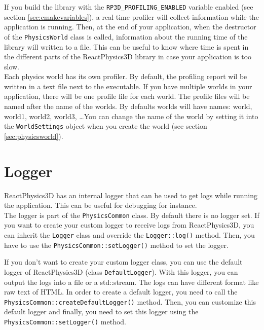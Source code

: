 \documentclass[a4paper,12pt]{article}
\begin{document}
    If you build the library with the \texttt{RP3D\_PROFILING\_ENABLED} variable enabled (see section \ref{sec:cmakevariables}), a real-time profiler
    will collect information while the application is running. Then, at the end of your application, when the destructor of the \texttt{PhysicsWorld}
    class is called, information about the running time of the library will written to a file.
    This can be useful to know where time is spent in the different parts of the ReactPhysics3D library in case your application is too slow. \\

    Each physics world has its own profiler. By default, the profiling report wil be written in a text file next to the executable.
    If you have multiple worlds in your application, there will be one profile file for each world. The profile files will be named after the
    name of the worlds. By defaults worlds will have names: world, world1, world2, world3, \dots You can change the name of the world by
    setting it into the \texttt{WorldSettings} object when you create the world (see section \ref{sec:physicsworld}). \\

    \section{Logger}
    \label{sec:logger}

    ReactPhysics3D has an internal logger that can be used to get logs while running the application. This can be useful for debugging for instance. \\

    The logger is part of the \texttt{PhysicsCommon} class. By default there is no logger set. If you want to create your custom logger to receive logs
    from ReactPhysics3D, you can inherit the \texttt{Logger} class and override the \texttt{Logger::log()} method. Then, you have to use the
    \texttt{PhysicsCommon::setLogger()} method to set the logger. \\

    \begin{sloppypar}
    If you don't want to create your custom logger class, you can use the default logger of ReactPhysics3D (class \texttt{DefaultLogger}). With this
    logger, you can output the logs into
    a file or a std::stream. The logs can have different format like raw text of HTML. In order to create a default logger, you need to call the
    \texttt{PhysicsCommon::createDefaultLogger()} method. Then, you can customize this default logger and finally, you need to set this logger using the
    \texttt{PhysicsCommon::setLogger()} method. \\
    \end{sloppypar}
\end{document}
